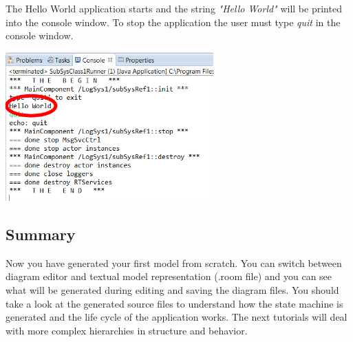 The Hello World application starts and the string \emph{"Hello World"} will be printed into the console window. To stop the application the user must type \emph{quit} in the console window.

\includegraphics[width=0.6\textwidth]{images/015-HelloWorld08.png}



\subsection{Summary}

Now you have generated your first \eTrice{} model from scratch. You can switch between diagram editor and 
textual model representation (.room file) and you can see what will be generated during editing and saving the diagram files. 
You should take a look at the generated source files to understand how the state machine is generated and 
the life cycle of the application works. The next tutorials will deal with more complex hierarchies in structure and behavior.
